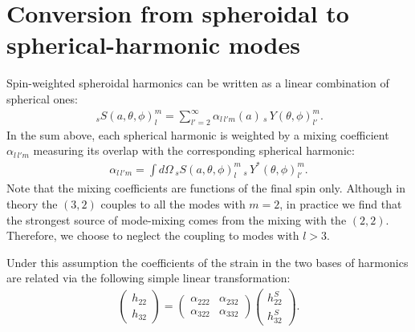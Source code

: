 \documentclass[twocolumn,prd,aps,superscriptaddress,preprintnumbers,tightenlines,showpacs,nofootinbib,eqsecnum,amsfonts,amsmath]{revtex4}
\begin{document}
\section{Conversion from spheroidal to spherical-harmonic modes}
\label{appendix:spheroidal_spherical}
Spin-weighted spheroidal harmonics can be written as a linear combination of spherical ones:
\begin{align}
\,_{s}S(a,\theta,\phi)^{m}_{l}=\sum_{l'=2}^{\infty}{\alpha_{l\,l'm}(a) \,_{s}\,Y(\theta,\phi)^{m}_{l'}}.
\end{align}
In the sum above, each spherical harmonic is weighted by a mixing coefficient $\alpha_{l\,l'm}$ measuring its overlap with the corresponding spherical harmonic: 
\begin{align}
\alpha_{l\,l'm}=\int{d\Omega\, _{s}S(a,\theta,\phi)^{m}_{l}  \,_{s}\,Y^{*}(\theta,\phi)^{m}_{l'} }.
\end{align} 
Note that the mixing coefficients are functions of the final spin only. 
Although in theory the $(3,2)$ couples to all the modes with $m=2$, in practice we find that the strongest source of mode-mixing comes from the mixing with the $(2,2)$. Therefore, we choose to neglect the coupling to modes with $l>3$.

Under this assumption 
the coefficients of the strain in the two bases of harmonics are related via the following simple linear transformation:
\begin{gather}
 \begin{pmatrix} h_{22} \\ h_{32}  \end{pmatrix}
 =
  \begin{pmatrix}
   \alpha_{222} &
   \alpha_{232} \\
    \alpha_{322}  &
    \alpha_{332}  
   \end{pmatrix}
    \begin{pmatrix} h_{22}^{S} \\ h_{32}^{S}  \end{pmatrix}.
\end{gather}
\end{document}

